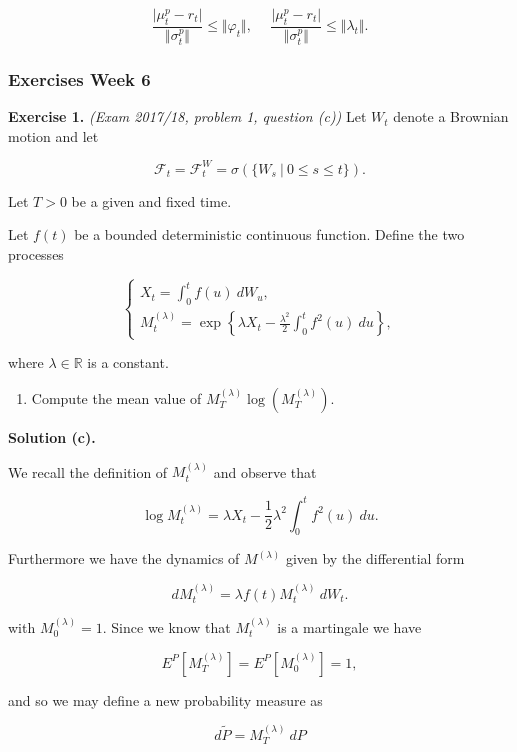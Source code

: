 \documentclass[
]{article}
\providecommand{\tightlist}{%
  \setlength{\itemsep}{0pt}\setlength{\parskip}{0pt}}
\begin{document}
\[
\frac{\vert \mu_t^p - r_t\vert}{\Vert \sigma_t ^p\Vert}\le \Vert \varphi_t\Vert,\hspace{15pt} \frac{\vert \mu_t^p - r_t\vert}{\Vert \sigma_t ^p\Vert}\le \Vert \lambda_t\Vert.
\]

\hypertarget{exercises-week-6}{%
\subsubsection{Exercises Week 6}\label{exercises-week-6}}

\textbf{Exercise 1.} \emph{(Exam 2017/18, problem 1, question (c))} Let
\(W_t\) denote a Brownian motion and let

\[
\mathcal{F}_t=\mathcal{F}_t^W=\sigma(\{W_s\ \vert\ 0\le s\le t\}).
\]

Let \(T>0\) be a given and fixed time.

Let \(f(t)\) be a bounded deterministic continuous function. Define the
two processes

\[
\begin{cases}
X_t=\int_0^tf(u)\ dW_u,\\
M^{(\lambda)}_t=\exp\left\{\lambda X_t-\frac{\lambda^2}{2}\int_0^t f^2(u)\ du\right\},
\end{cases}
\]

where \(\lambda\in\mathbb{R}\) is a constant.

\begin{enumerate}
\def\labelenumi{\alph{enumi}.}
\setcounter{enumi}{2}
\tightlist
\item
  Compute the mean value of \(M^{(\lambda)}_T\log(M^{(\lambda)}_T)\).
\end{enumerate}

\textbf{Solution (c).}

We recall the definition of \(M_t^{(\lambda)}\) and observe that

\[
\log M_t^{(\lambda)}=\lambda X_t-\frac{1}{2}\lambda ^2\int_0^t f^2(u)\ du.
\]

Furthermore we have the dynamics of \(M^{(\lambda)}\) given by the
differential form

\[
dM_t^{(\lambda)}=\lambda f(t)M_t^{(\lambda)}\ dW_t.
\]

with \(M_0^{(\lambda)}=1\). Since we know that \(M_t^{(\lambda)}\) is a
martingale we have

\[
E^P[M_T^{(\lambda)}]=E^P[M_0^{(\lambda)}]=1,
\]

and so we may define a new probability measure as

\[
d\tilde{P}=M_T^{(\lambda)}\ dP
\]
\end{document}
